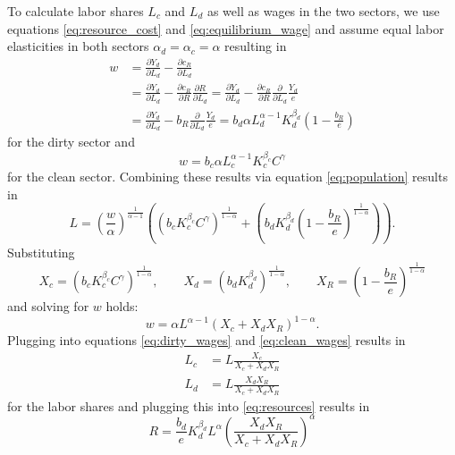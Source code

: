 To calculate labor shares $L_c$ and $L_d$ as well as wages in the two sectors, we use equations \eqref{eq:resource_cost} and \eqref{eq:equilibrium_wage} and assume equal labor elasticities in both sectors $\alpha_d = \alpha_c = \alpha$ resulting in
\begin{align}
	w &= \frac{\partial Y_d}{\partial L_d} - \frac{\partial c_R}{\partial L_d} \nonumber \\
	&= \frac{\partial Y_d}{\partial L_d} - \frac{\partial c_R}{\partial R} \frac{\partial R}{\partial L_d} \nonumber = \frac{\partial Y_d}{\partial L_d} - \frac{\partial c_R}{\partial R} \frac{\partial}{\partial L_d} \frac{Y_d}{e} \nonumber \\
	&= \frac{\partial Y_d}{\partial L_d} - b_R \frac{\partial}{\partial L_d} \frac{Y_d}{e} = b_d \alpha L_d^{\alpha-1} K_d^{\beta_d}\left( 1-\frac{b_R}{e} \right)
	\label{eq:dirty_wages}
\end{align}
for the dirty sector and
\begin{equation}
	w = b_c \alpha L_c^{\alpha-1} K_c^{\beta_c} C^{\gamma}
	\label{eq:clean_wages}
\end{equation}
for the clean sector. Combining these results via equation \eqref{eq:population} results in
\begin{equation}
	L = \left( \frac{w}{\alpha} \right)^{\frac{1}{\alpha-1}}\left( \left( b_c K_c^{\beta_c}C^{\gamma} \right)^{\frac{1}{1-\alpha}} + \left( b_d K_d^{\beta_d} \left( 1 - \frac{b_R}{e} \right)^{\frac{1}{1-\alpha}} \right) \right).
\end{equation}
Substituting 
\begin{equation}
	X_c = (b_c K_c^{\beta_c}C^{\gamma})^{\frac{1}{1-\alpha}}, \qquad X_d = (b_d K_d^{\beta_d})^{\frac{1}{1-\alpha}}, \qquad X_R = \left( 1 - \frac{b_R}{e} \right)^{\frac{1}{1-\alpha}}
	\label{eq:substitutions}
\end{equation}
and solving for $w$ holds:
\begin{equation}
	w = \alpha L^{\alpha-1}\left( X_c + X_d X_R \right)^{1-\alpha}.
	\label{eq:wage_result}
\end{equation}
Plugging into equations \eqref{eq:dirty_wages} and \eqref{eq:clean_wages} results in 
\begin{align}
	L_c &= L \frac{X_c}{X_c + X_d X_R} \label{eq:clean_labor} \\
	L_d &= L \frac{X_d X_R}{X_c + X_d X_R} \label{eq:dirty_labor}
\end{align}
for the labor shares and plugging this into \eqref{eq:resources} results in
\begin{equation}
	R = \frac{b_d}{e}K_d^{\beta_d}L^{\alpha}\left( \frac{X_d X_R}{X_c + X_d X_R} \right)^{\alpha}
	\label{eq:R_result}
\end{equation}
